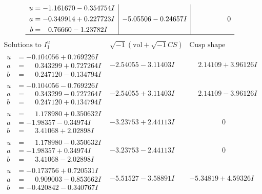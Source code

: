 \documentclass[1p]{elsarticle_modified}
\theoremstyle{definition}
\newcommand{\I}{\sqrt{-1}}
\begin{document}
$$\begin{array}{c|c|c}
\begin{aligned}
u &= -1.161670 - 0.354754 I \\
a &= -0.349914 + 0.227723 I \\
b &= \phantom{-}0.76660 - 1.23782 I\end{aligned}
 & -5.05506 - 0.24657 I & \phantom{-0.000000 } 0\\
 \hline 
 \end{array}$$\newpage$$\begin{array}{c|c|c}  
\text{Solutions to }I^u_{1}& \I (\text{vol} + \sqrt{-1}CS) & \text{Cusp shape}\\
 \hline 
\begin{aligned}
u &= -0.104056 + 0.769226 I \\
a &= \phantom{-}0.343299 + 0.727264 I \\
b &= \phantom{-}0.247120 - 0.134794 I\end{aligned}
 & -2.54055 - 3.11403 I & \phantom{-}2.14109 + 3.96126 I \\ \hline\begin{aligned}
u &= -0.104056 - 0.769226 I \\
a &= \phantom{-}0.343299 - 0.727264 I \\
b &= \phantom{-}0.247120 + 0.134794 I\end{aligned}
 & -2.54055 + 3.11403 I & \phantom{-}2.14109 - 3.96126 I \\ \hline\begin{aligned}
u &= \phantom{-}1.178980 + 0.350632 I \\
a &= -1.98357 - 0.34974 I \\
b &= \phantom{-}3.41068 + 2.02898 I\end{aligned}
 & -3.23753 + 2.44113 I & \phantom{-0.000000 } 0 \\ \hline\begin{aligned}
u &= \phantom{-}1.178980 - 0.350632 I \\
a &= -1.98357 + 0.34974 I \\
b &= \phantom{-}3.41068 - 2.02898 I\end{aligned}
 & -3.23753 - 2.44113 I & \phantom{-0.000000 } 0 \\ \hline\begin{aligned}
u &= -0.173756 + 0.720531 I \\
a &= \phantom{-}0.909003 - 0.853662 I \\
b &= -0.420842 - 0.340767 I\end{aligned}
 & -5.51527 - 3.58891 I & -5.34819 + 4.59326 I \\ \hline\begin{aligned}

\end{aligned}
\end{array}$$
\end{document}
